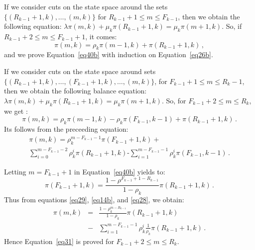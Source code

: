 \documentclass[conference]{IEEEtran}
\begin{document}
\begin{IEEEproof}
If we consider cuts on the state space around the sets $\{(R_{k-1}+1,k), \ldots,(m,k)\}$ for  $R_{k-1}+1 \leq m \leq F_{k-1}$, then we obtain
the following equation: $\lambda \pi(m,k) + \mu_k \pi(R_{k-1}+1,k) = \mu_k \pi(m+1,k)$.
So, if $ R_{k-1}+2 \leq m \leq F_{k-1}+1$, it comes:
\begin{equation}
\pi(m,k) = \rho_k \pi(m-1,k)+ \pi(R_{k-1}+1,k) \, ,
\label{eq26b}
\end{equation}
and we prove Equation~\eqref{eq40b} with induction on Equation~\eqref{eq26b}.

If we consider cuts on the state space around sets $\{(R_{k-1}+1,k), \ldots,(F_{k-1}+1,k),\ldots,(m,k)\}$, for  $F_{k-1}+1 \leq m \leq R_{k}-1$,
then we obtain the following balance equation: $\lambda \pi(m,k) + \mu_k \pi(R_{k-1}+1,k)=\mu_k \pi(m+1,k)$.
So, for $F_{k-1}+2 \leq m \leq R_{k}$, we get :
\begin{equation}
\pi(m,k) = \rho_k \pi(m-1,k)-\rho_k \pi(F_{k- \!1},k-\!1)+ \pi(R_{k-1} \! + \!1,k) \, .
\label{eq26}
\end{equation}
Its follows from the preceeding equation:
\begin{multline}\label{eq28}
\pi(m,k) = \rho_k^{m-F_{k-1}-1}\pi(F_{k-1}+1,k)+ \\
\sum_{i=0}^{m-F_{k-1}-2} \rho_k^i\pi(R_{k-1}+1,k)\mbox{-}\sum_{i=1}^{m-F_{k-1}-1} \rho_k^i \pi(F_{k-1},k-1) \, .
\end{multline}

Letting $m=F_{k-1}+1$ in Equation~\eqref{eq40b} yields to:
\begin{equation}
\pi(F_{k-1}+1,k)=\frac{1-\rho^{ F_{k-1}+1-R_{k-1}} }{1-\rho_k}\pi(R_{k-1}+1,k) \, .
\label{eq29}
\end{equation}
Thus from equations \eqref{eq29}, \eqref{eq14b}, and \eqref{eq28},  we obtain:
\begin{eqnarray}
\pi(m,k)&=&\frac{1-\rho_k^{m-R_{k-1}} } {1-\rho_k} \pi(R_{k-1}+1,k) \nonumber\\
&-& \sum_{i=1}^{m-F_{k-1}-1} \rho_k^i \frac{1}{\rho_k} \pi(R_{k-1}+1,k) \, .
\label{eq30}
\end{eqnarray}
Hence Equation~\eqref{eq31} is proved for $F_{k-1}+2 \leq m \leq R_{k}$.


\end{IEEEproof}
\end{document}
